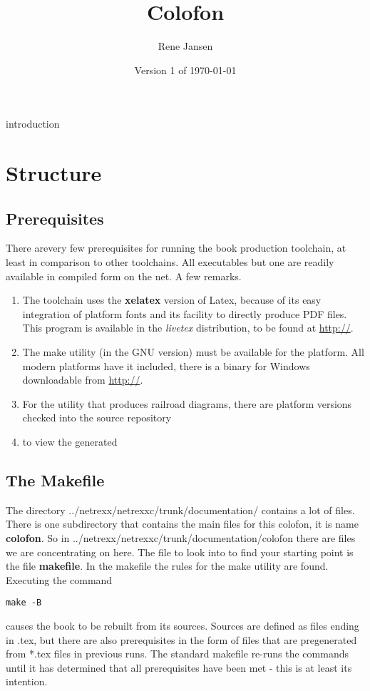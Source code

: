 
    
\renewcommand{\isbn}{978-90-819090-2-0}    
\setcounter{tocdepth}{1} 
\title{Colofon}
\author{Rene Jansen}
\date{Version 1 of \today}
\maketitle
{}
\pagestyle{plain}
\frontmatter
{}
\pagestyle{plain}

\tableofcontents
\newpage
{}
\frontmatter
\large


 {introduction}
\mainmatter
\chapter{Structure}
\section{Prerequisites}
There arevery few prerequisites for running the book production
toolchain, at least in comparison to other toolchains. All executables
but one are readily available in compiled form on the net. A few
remarks.
\begin{enumerate}
\item The toolchain uses the \textbf{xelatex} version of Latex, because of
its easy integration of platform fonts and its facility to directly
produce PDF files. This program is available in the \emph{livetex}
distribution, to be found at \url{http://}.
\item The make utility (in the GNU version) must be available for the
  platform. All modern platforms have it included, there is a binary
  for Windows downloadable from \url{http://}.
\item For the utility that produces railroad diagrams, there are
  platform versions checked into the \nr source repository
\item to view the generated
\end{enumerate}

\section{The Makefile}
The directory ../netrexx/netrexxc/trunk/documentation/ contains a lot
of files. There is one subdirectory that contains the main files for
this colofon, it is name \textbf{colofon}. So in
../netrexx/netrexxc/trunk/documentation/colofon there are files we are
concentrating on here. The file to look into to find your starting
point is the file \textbf{makefile}. In the makefile the rules for the
make utility are found. Executing the command
\begin{verbatim}
make -B
\end{verbatim}
causes the book to be rebuilt from its sources. Sources are defined as
files ending in .tex, but there are also prerequisites in the form of
files that are pregenerated from *.tex files in previous runs. The
standard makefile re-runs the commands until it has determined that
all prerequisites have been met - this is at least its intention.

